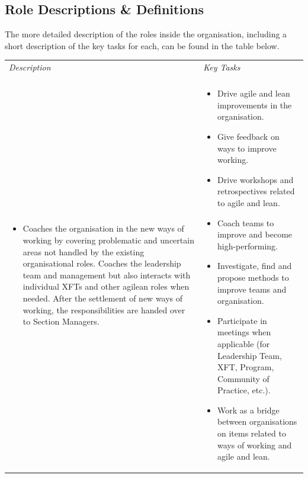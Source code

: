 \newpage

\subsection{Role Descriptions \& Definitions}

The more detailed description of the roles inside the organisation, including a short description of the key tasks for each, can be found in the table below. %

\begin{table}[h]
   \begin{tabularx}{\textwidth}{ | p{6.9cm} | p{6.9cm} | }
   
   \hline
   \emph{Description} & \emph{Key Tasks} \\ 
   \hhline{==}
   
   \multicolumn{2}{ | c | }{\textbf{Agile Coach}}
   
   \\ \hline
   
   \begin{itemize}[label={}, leftmargin=*, topsep=0pt, itemsep=0pt, partopsep=0pt]
     \item Coaches the organisation in the new ways of working by covering problematic and uncertain areas not handled by the existing organisational roles. Coaches the leadership team and management but also interacts with individual \acp{XFT} and other agilean roles when needed. After the settlement of new ways of working, the responsibilities are handed over to Section Managers. 
   \end{itemize} &
   
   \begin{itemize}[label={}, leftmargin=*, topsep=0pt, itemsep=0pt, partopsep=0pt]
     \item Drive agile and lean improvements in the organisation.
     \item Give feedback on ways to improve working.
     \item Drive workshops and retrospectives related to agile and lean.
     \item Coach teams to improve and become high-performing.
     \item Investigate, find and propose methods to improve teams and organisation.
     \item Participate in meetings when applicable (for Leadership Team, XFT, Program, Community of Practice, etc.).
     \item Work as a bridge between organisations on items related to ways of working and agile and lean.
   \end{itemize}
   

\end{tabularx}
\end{table}
